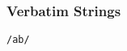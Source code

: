\begin{frame}

\frametitle{Verbatim Strings}

\vspace{\fill}

\begin{center}

\Large\texttt{/ab/}

\end{center}

\vspace{\fill}



\end{frame}
